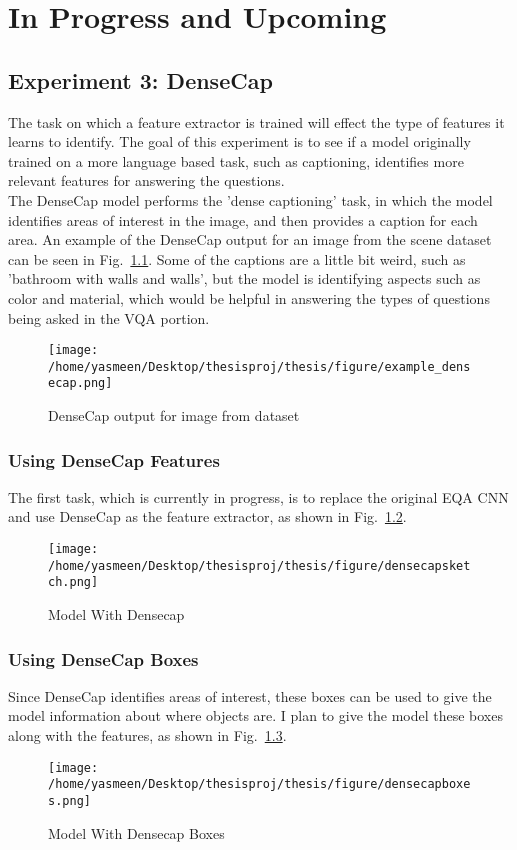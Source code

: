 \chapter{In Progress and Upcoming}
\section{Experiment 3: DenseCap}
The task on which a feature extractor is trained will effect the type of features it learns to identify. The goal of this experiment is to see if a model originally trained on a more language based task, such as captioning, identifies more relevant features for answering the questions. \\
The DenseCap model performs the 'dense captioning' task, in which the model identifies areas of interest in the image, and then provides a caption for each area\cite{densecap}. An example of the DenseCap output for an image from the scene dataset can be seen in Fig.~\ref{fig:example_densecap}. Some of the captions are a little bit weird, such as 'bathroom with walls and walls', but the model is identifying aspects such as color and material, which would be helpful in answering the types of questions being asked in the VQA portion. 

\begin{figure}[h]
     \centering
     \texttt{[image: /home/yasmeen/Desktop/thesisproj/thesis/figure/example\_densecap.png]}
     \caption{DenseCap output for image from dataset}
     \label{fig:example_densecap}
\end{figure}


\subsection{Using DenseCap Features}
The first task, which is currently in progress, is to replace the original EQA CNN and use DenseCap as the feature extractor, as shown in Fig.~\ref{fig:densecap_feats}.

\begin{figure}[h]
     \centering
     \texttt{[image: /home/yasmeen/Desktop/thesisproj/thesis/figure/densecapsketch.png]}
     \caption{Model With Densecap}
     \label{fig:densecap_feats}
\end{figure}


\subsection{Using DenseCap Boxes}
Since DenseCap identifies areas of interest, these boxes can be used to give the model information about where objects are. I plan to give the model these boxes along with the features, as shown in Fig.~\ref{fig:densecap_boxes}. 

\begin{figure}[h]
     \centering
     \texttt{[image: /home/yasmeen/Desktop/thesisproj/thesis/figure/densecapboxes.png]}
     \caption{Model With Densecap Boxes}
     \label{fig:densecap_boxes}
\end{figure}
